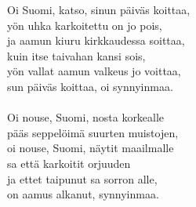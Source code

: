 
            Oi Suomi, katso, sinun päiväs koittaa, \\
            yön uhka karkoitettu on jo pois, \\
            ja aamun kiuru kirkkaudessa soittaa, \\
            kuin itse taivahan kansi sois, \\
            yön vallat aamun valkeus jo voittaa, \\
            sun päiväs koittaa, oi synnyinmaa. \\
\hspace{10mm} \\
            Oi nouse, Suomi, nosta korkealle \\
            pääs seppelöimä suurten muistojen, \\
            oi nouse, Suomi, näytit maailmalle \\
            sa että karkoitit orjuuden \\
            ja ettet taipunut sa sorron alle, \\
            on aamus alkanut, synnyinmaa. \\
